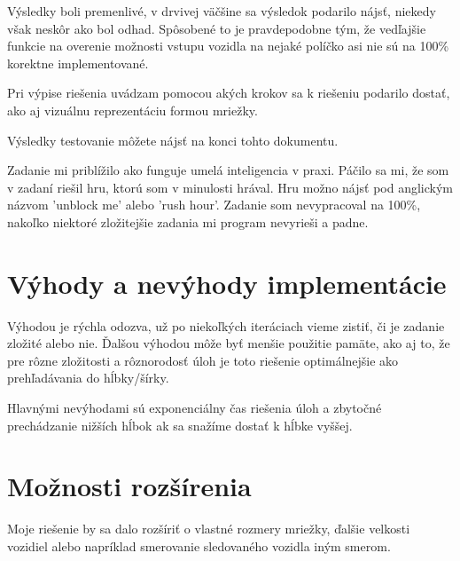 \documentclass[10pt,oneside,slovak,a4paper]{article}
\begin{document}
\medskip

Výsledky boli premenlivé, v drvivej väčšine sa výsledok podarilo nájsť, niekedy však neskôr ako bol odhad. 
Spôsobené to je pravdepodobne tým, že vedľajšie funkcie na overenie možnosti vstupu vozidla na nejaké políčko asi nie sú na 100\% korektne implementované.

\medskip 

Pri výpise riešenia uvádzam pomocou akých krokov sa k riešeniu podarilo dostať, ako aj vizuálnu reprezentáciu formou mriežky.



Výsledky testovanie môžete nájsť na konci tohto dokumentu.  


Zadanie mi priblížilo ako funguje umelá inteligencia v praxi. Páčilo sa mi, že som v zadaní riešil hru, ktorú som v minulosti hrával. Hru možno nájsť pod anglickým názvom 'unblock me' alebo 'rush hour'. Zadanie som nevypracoval na 100\%, nakoľko niektoré zložitejšie zadania mi program nevyrieši a padne.

\section{Výhody a nevýhody implementácie}

Výhodou je rýchla odozva, už po niekoľkých iteráciach vieme zistiť, či je zadanie zložité alebo nie. Ďalšou výhodou môže byť menšie použitie pamäte, ako aj to, že pre rôzne zložitosti a rôznorodosť úloh je toto riešenie optimálnejšie ako prehľadávania do hĺbky/šírky.

Hlavnými nevýhodami sú exponenciálny čas riešenia úloh a zbytočné prechádzanie nižších hĺbok ak sa snažíme dostať k hĺbke vyššej.

\section{Možnosti rozšírenia}

Moje riešenie by sa dalo rozšíriť o vlastné rozmery mriežky, ďalšie velkosti vozidiel alebo napríklad smerovanie sledovaného vozidla iným smerom.
\end{document}
